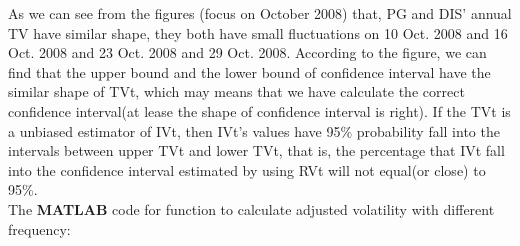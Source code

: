 \documentclass[12pt,letterpaper]{article}
\begin{document}
\begin{enumerate}[label=\textbf{(\Alph*)}]
As we can see from the figures (focus on October 2008) that, PG and DIS' annual TV have similar shape, they both have small fluctuations on 10 Oct. 2008 and 16 Oct. 2008 and 23 Oct. 2008 and 29 Oct. 2008. According to the figure, we can find that the upper bound and the lower bound of confidence interval have the similar shape of TVt, which may means that we have calculate the correct confidence interval(at lease the shape of confidence interval is right). If the TVt is a unbiased estimator of IVt, then IVt's values have 95\% probability fall into the intervals between upper TVt and lower TVt, that is, the percentage that IVt fall into the confidence interval estimated by using RVt will not equal(or close) to 95\%.\\

The \textbf{MATLAB} code for function to calculate adjusted volatility with different frequency:
   
\end{enumerate}
\newpage

\end{document}
